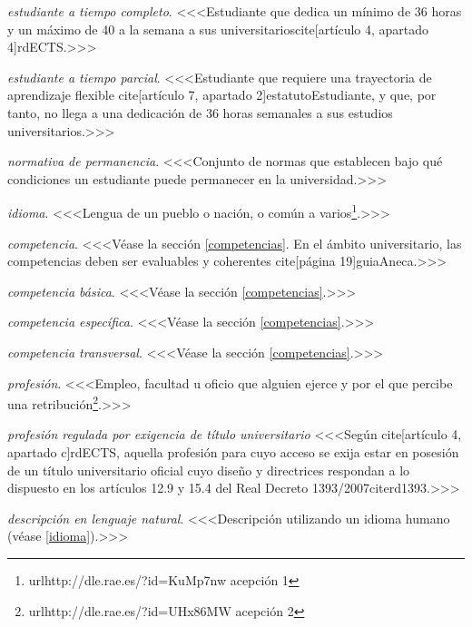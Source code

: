     \item \emph{estudiante a tiempo completo}. <<<Estudiante que dedica un mínimo de 36 horas y un máximo de 40 a la semana a sus universitarioscite[artículo 4, apartado 4]{rdECTS}.>>>

    \item \emph{estudiante a tiempo parcial}. <<<Estudiante que requiere una trayectoria de aprendizaje flexible cite[artículo 7, apartado 2]{estatutoEstudiante}, y que, por tanto, no llega a una dedicación de 36 horas semanales a sus estudios universitarios.>>>

    \item \emph{normativa de permanencia}. <<<Conjunto de normas que establecen bajo qué condiciones un estudiante puede permanecer en la universidad.>>>

    \item \emph{idioma}. <<<Lengua de un pueblo o nación, o común a varios\footnote{url{http://dle.rae.es/?id=KuMp7nw} acepción 1}.>>>

    \item \emph{competencia}. <<<Véase la sección \ref{competencias}.  En el ámbito universitario, las competencias deben ser evaluables y coherentes cite[página 19]{guiaAneca}.>>>

    \item \emph{competencia básica}. <<<Véase la sección \ref{competencias}.>>>

    \item \emph{competencia específica}. <<<Véase la sección \ref{competencias}.>>>

    \item \emph{competencia transversal}. <<<Véase la sección \ref{competencias}.>>>

    \item \emph{profesión}. <<<Empleo, facultad u oficio que alguien ejerce y por el que percibe una retribución\footnote{url{http://dle.rae.es/?id=UHx86MW} acepción 2}.>>>

    \item \emph{profesión regulada por exigencia de título universitario} <<<Según cite[artículo 4, apartado c]{rdECTS}, aquella profesión para cuyo acceso se exija estar en posesión de un título universitario oficial cuyo diseño y directrices respondan a lo dispuesto en los artículos 12.9 y 15.4 del Real Decreto 1393/2007cite{rd1393}.>>>

    \item \emph{descripción en lenguaje natural}. <<<Descripción utilizando un idioma humano (véase \ref{idioma}).>>>


